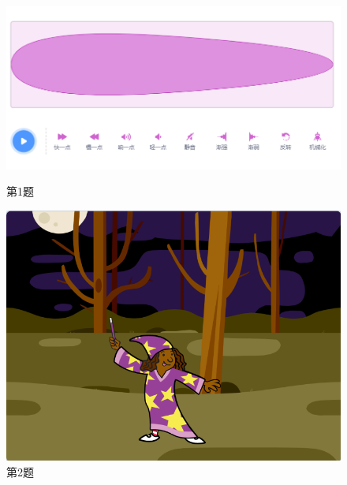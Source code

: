 \documentclass[10pt, a4paper]{article}
\begin{document}
\begin{enumerate}
        \begin{figure}[htbp]
            \centering
            \begin{minipage}[t]{.33\textwidth}
                \centering
                \includegraphics[width=1\textwidth]{1.png}
                \caption*{第1题}
            \end{minipage}
            \begin{minipage}[t]{.2\textwidth}
                \centering
                \includegraphics[width=\textwidth]{2.png}
                \caption*{第2题}
            \end{minipage}
            \begin{minipage}[t]{.17\textwidth}
                \centering

\end{minipage}
\end{figure}
\end{enumerate}
\end{document}
